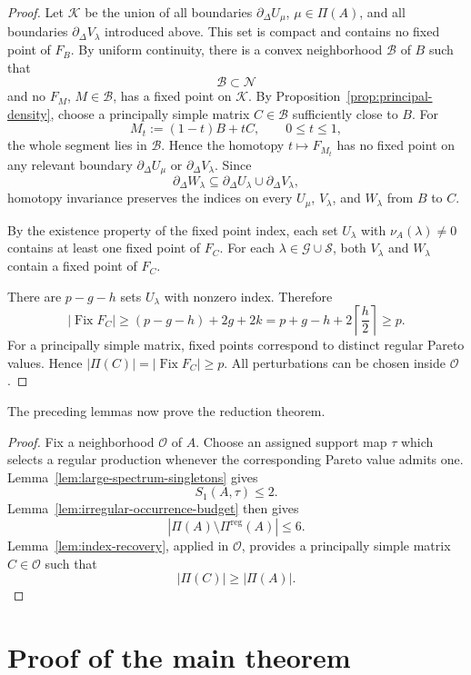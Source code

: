 \documentclass[11pt,a4paper]{article}
\theoremstyle{definition}
\newcommand{\Fix}{\operatorname{Fix}}
\begin{document}
\begin{proof}
Let $\mathcal K$ be the union of all boundaries
$\partial_\Delta U_\mu$, $\mu\in\Pi(A)$, and all boundaries
$\partial_\Delta V_\lambda$ introduced above. This set is compact and
contains no fixed point of $F_B$. By uniform continuity, there is a
convex neighborhood $\mathcal B$ of $B$ such that
$$
\mathcal B\subset\mathcal N
$$
and no $F_M$, $M\in\mathcal B$, has a fixed point on $\mathcal K$.
By Proposition~\ref{prop:principal-density}, choose a principally
simple matrix $C\in\mathcal B$ sufficiently close to $B$. For
$$
M_t:=(1-t)B+tC,
\qquad
0\leq t\leq1,
$$
the whole segment lies in $\mathcal B$. Hence the homotopy
$t\mapsto F_{M_t}$ has no fixed point on any relevant boundary
$\partial_\Delta U_\mu$ or $\partial_\Delta V_\lambda$. Since
$$
\partial_\Delta W_\lambda
\subseteq
\partial_\Delta U_\lambda\cup\partial_\Delta V_\lambda,
$$
homotopy invariance preserves the indices on every $U_\mu$,
$V_\lambda$, and $W_\lambda$ from $B$ to $C$.

By the existence property of the fixed point index, each set
$U_\lambda$ with $\nu_A(\lambda)\neq0$ contains at least one fixed
point of $F_C$. For each $\lambda\in\mathcal G\cup\mathcal S$, both
$V_\lambda$ and $W_\lambda$ contain a fixed point of $F_C$.

There are $p-g-h$ sets $U_\lambda$ with nonzero index. Therefore
$$
|\Fix F_C|
\geq
(p-g-h)+2g+2k
=
p+g-h+2\left\lceil\frac h2\right\rceil
\geq p.
$$
For a principally simple matrix, fixed points correspond to distinct
regular Pareto values. Hence $|\Pi(C)|=|\Fix F_C|\geq p$. All
perturbations can be chosen inside $\mathcal O$.
\end{proof}

The preceding lemmas now prove the reduction theorem.

\begin{proof}
Fix a neighborhood $\mathcal O$ of $A$. Choose an assigned support map
$\tau$ which selects a regular production whenever the corresponding
Pareto value admits one. Lemma~\ref{lem:large-spectrum-singletons}
gives
$$
S_1(A,\tau)\leq2.
$$
Lemma~\ref{lem:irregular-occurrence-budget} then gives
$$
|\Pi(A)\setminus\Pi^{\mathrm{reg}}(A)|\leq6.
$$
Lemma~\ref{lem:index-recovery}, applied in $\mathcal O$, provides a
principally simple matrix $C\in\mathcal O$ such that
$$
|\Pi(C)|\geq|\Pi(A)|.
$$
\end{proof}

\section{Proof of the main theorem}
\label{sec:proof-main}
\end{document}
